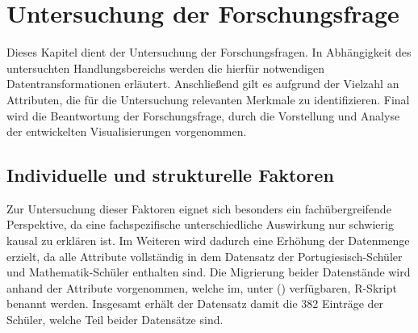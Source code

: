 \chapter[Untersuchung der Forschungsfrage]{Untersuchung der Forschungsfrage}

Dieses Kapitel dient der Untersuchung der Forschungsfragen. 
In Abhängigkeit des untersuchten Handlungsbereichs werden die hierfür notwendigen Datentransformationen erläutert. 
Anschließend gilt es aufgrund der Vielzahl an Attributen, die für die Untersuchung relevanten Merkmale zu identifizieren. 
Final wird die Beantwortung der Forschungsfrage, durch die Vorstellung und Analyse der entwickelten Visualisierungen vorgenommen.

\section{Individuelle und strukturelle Faktoren}

Zur Untersuchung dieser Faktoren eignet sich besonders ein fachübergreifende Perspektive, da eine fachspezifische unterschiedliche Auswirkung nur schwierig kausal zu erklären ist.
Im Weiteren wird dadurch eine Erhöhung der Datenmenge erzielt, da alle Attribute vollständig in dem Datensatz der Portugiesisch-Schüler und Mathematik-Schüler enthalten sind.
Die Migrierung beider Datenstände wird anhand der Attribute vorgenommen, welche im, unter (\cite[]{student_performance}) verfügbaren, R-Skript benannt werden.
Insgesamt erhält der Datensatz damit die 382 Einträge der Schüler, welche Teil beider Datensätze sind. 

